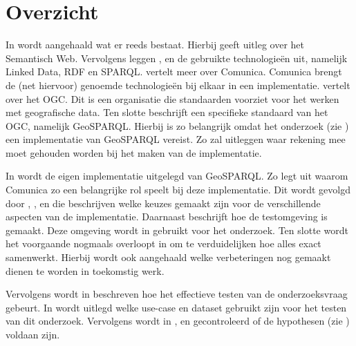 \section{Overzicht}

In  wordt aangehaald wat er reeds bestaat. Hierbij geeft  uitleg over het Semantisch Web. Vervolgens leggen ,  en  de gebruikte technologieën uit, namelijk Linked Data, RDF en SPARQL.  vertelt meer over Comunica. Comunica brengt de (net hiervoor) genoemde technologieën bij elkaar in een implementatie.  vertelt over het OGC. Dit is een organisatie die standaarden voorziet voor het werken met geografische data. Ten slotte beschrijft  een specifieke standaard van het OGC, namelijk GeoSPARQL. Hierbij is  zo belangrijk omdat het onderzoek (zie ) een implementatie van GeoSPARQL vereist. Zo zal  uitleggen waar rekening mee moet gehouden worden bij het maken van de implementatie.

In  wordt de eigen implementatie uitgelegd van GeoSPARQL. Zo legt  uit waarom Comunica zo een belangrijke rol speelt bij deze implementatie. Dit wordt gevolgd door , ,  en  die beschrijven welke keuzes gemaakt zijn voor de verschillende aspecten van de implementatie. Daarnaast beschrijft  hoe de testomgeving is gemaakt. Deze omgeving wordt in  gebruikt voor het onderzoek. Ten slotte wordt het voorgaande nogmaals overloopt in  om te verduidelijken hoe alles exact samenwerkt. Hierbij wordt ook aangehaald welke verbeteringen nog gemaakt dienen te worden in toekomstig werk.

Vervolgens wordt in  beschreven hoe het effectieve testen van de onderzoeksvraag gebeurt. In  wordt uitlegd welke use-case en dataset gebruikt zijn voor het testen van dit onderzoek. Vervolgens wordt in ,  en  gecontroleerd of de hypothesen (zie ) voldaan zijn.

